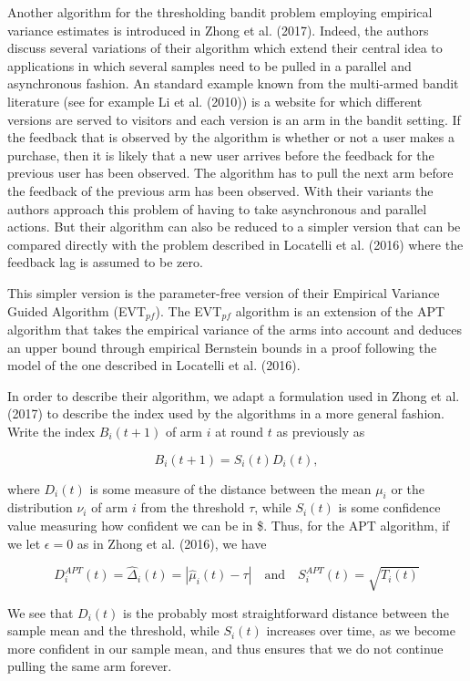 \documentclass[11pt,]{article}
\begin{document}
Another algorithm for the thresholding bandit problem employing
empirical variance estimates is introduced in Zhong et al. (2017).
Indeed, the authors discuss several variations of their algorithm which
extend their central idea to applications in which several samples need
to be pulled in a parallel and asynchronous fashion. An standard example
known from the multi-armed bandit literature (see for example Li et al.
(2010)) is a website for which different versions are served to visitors
and each version is an arm in the bandit setting. If the feedback that
is observed by the algorithm is whether or not a user makes a purchase,
then it is likely that a new user arrives before the feedback for the
previous user has been observed. The algorithm has to pull the next arm
before the feedback of the previous arm has been observed. With their
variants the authors approach this problem of having to take
asynchronous and parallel actions. But their algorithm can also be
reduced to a simpler version that can be compared directly with the
problem described in Locatelli et al. (2016) where the feedback lag is
assumed to be zero.

This simpler version is the parameter-free version of their Empirical
Variance Guided Algorithm (EVT\(_{pf}\)). The EVT\(_{pf}\) algorithm is
an extension of the APT algorithm that takes the empirical variance of
the arms into account and deduces an upper bound through empirical
Bernstein bounds in a proof following the model of the one described in
Locatelli et al. (2016).

In order to describe their algorithm, we adapt a formulation used in
Zhong et al. (2017) to describe the index used by the algorithms in a
more general fashion. Write the index \(B_i(t+1)\) of arm \(i\) at round
\(t\) as previously as

\[
B_i(t+1) = S_i(t) D_i(t),
\]

where \(D_i(t)\) is some measure of the distance between the mean
\(\mu_i\) or the distribution \(\nu_i\) of arm \(i\) from the threshold
\(\tau\), while \(S_i(t)\) is some confidence value measuring how
confident we can be in \$. Thus, for the APT algorithm, if we let
\(\epsilon = 0\) as in Zhong et al. (2016), we have

\[
D_i^{APT}(t) = \hat{\Delta}_i(t) = |\hat{\mu}_i(t) - \tau| \quad \text{and} \quad S_i^{APT}(t) = \sqrt{T_i(t)}
\]

We see that \(D_i(t)\) is the probably most straightforward distance
between the sample mean and the threshold, while \(S_i(t)\) increases
over time, as we become more confident in our sample mean, and thus
ensures that we do not continue pulling the same arm forever.
\end{document}

